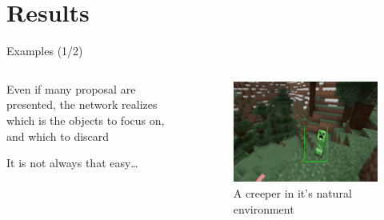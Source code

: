 \documentclass[english]{beamer}
\begin{document}
\section{Results}
\begin{frame}{Examples (1/2)}
	\begin{columns}
	    
	    \begin{column}{0.5\textwidth}

	    Even if many proposal are presented, the network realizes which is the objects to focus on, and which to discard

      It is not always that easy\dots
	
	    \end{column}
	
	    \begin{column}{0.5\textwidth}
	      \begin{figure}
	        \centering
	            \includegraphics[width=1.0\textwidth]{../images/nice_creeper.png}
	            \caption{A creeper in it's natural environment}
	        \end{figure}
	    \end{column}
	  \end{columns}
\end{frame}
\end{document}
